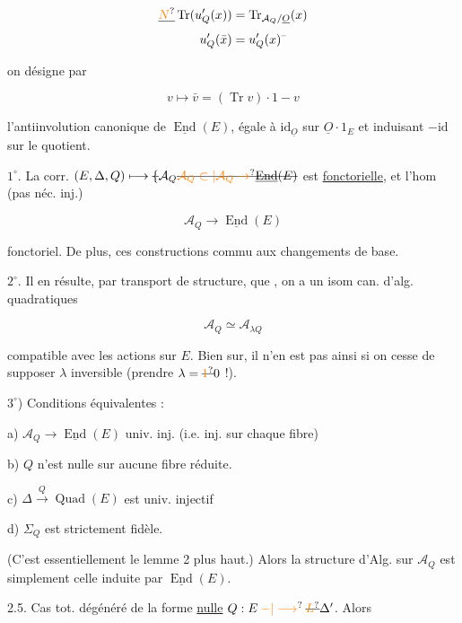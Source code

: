 \[
\begin{aligned}
\deleted{\unsure{N}}\operatorname{Tr}(u'_Q(x))&=\operatorname{Tr}_{\mathcal A_Q/\underline O}(x)\\
u'_Q(\bar x)&=u'_Q(x)^{\text{--}}
\end{aligned}
\]

 on désigne par

\[
v\longmapsto\bar v=(\operatorname{Tr}v)\cdot1-v
\]

l'antiinvolution canonique de $\underline{\operatorname{End}}(E)$, égale à $\mathrm{id}_{\underline O}$ sur $\underline O\cdot1_E$ et induisant $-\mathrm{id}$ sur le quotient.

 $1^\circ$. La corr. $(E,\Delta,Q)\longmapsto\deleted{\{}\mathcal A_Q\deleted{\unsure{\mathcal A_Q\subset|\mathcal A_Q\to}\underline{\operatorname{End}}(E)}$ est \uline{fonctorielle}, et l'hom (pas néc. inj.)

\[
\mathcal A_Q\longrightarrow\underline{\operatorname{End}}(E)
\]

 fonctoriel. De plus, ces constructions commu aux changements de base.

$2^\circ$. Il en résulte, par transport de structure, que , on a un isom can. d'alg. quadratiques

\[
\mathcal A_Q\simeq\mathcal A_{\lambda Q}
\]

compatible avec les actions sur $E$. Bien sur, il n'en est pas ainsi si on cesse de supposer $\lambda$ inversible (prendre $\lambda=\deleted{\unsure{1}}0$ !).

$3^\circ$) Conditions équivalentes :

a) $\mathcal A_Q\longrightarrow\underline{\operatorname{End}}(E)$ univ. inj. (i.e. inj. sur chaque fibre)

b) $Q$ n'est nulle sur aucune fibre réduite.

c) $\Delta\overset{Q}{\longrightarrow}\operatorname{Quad}(E)$ est univ. injectif

d) $\Sigma_Q$ est strictement fidèle.

(C'est essentiellement le lemme 2 plus haut.) Alors la structure d'Alg. sur $\mathcal A_Q$ est simplement celle induite par $\underline{\operatorname{End}}(E)$.

2.5. Cas tot. dégénéré de la forme \uline{nulle} $Q:E\mathbin{\unsure{-|\longrightarrow}}\deleted{\unsure{L}}\Delta'$. Alors


